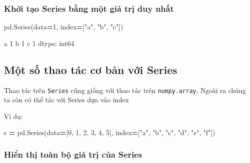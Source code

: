 \documentclass[
]{book}
\newenvironment{Shaded}{\begin{snugshade}}{\end{snugshade}}
\newcommand{\DecValTok}[1]{\textcolor[rgb]{0.00,0.00,0.81}{#1}}
\newcommand{\NormalTok}[1]{#1}
\newcommand{\OperatorTok}[1]{\textcolor[rgb]{0.81,0.36,0.00}{\textbf{#1}}}
\newcommand{\StringTok}[1]{\textcolor[rgb]{0.31,0.60,0.02}{#1}}
\begin{document}
\subsubsection*{Khởi tạo Series bằng một giá trị duy nhất}\label{khux1edfi-tux1ea1o-series-bux1eb1ng-mux1ed9t-giuxe1-trux1ecb-duy-nhux1ea5t}


\begin{Shaded}
\begin{Highlighting}[]
\NormalTok{pd.Series(data}\OperatorTok{=}\DecValTok{1}\NormalTok{, index}\OperatorTok{=}\NormalTok{[}\StringTok{"a"}\NormalTok{, }\StringTok{"b"}\NormalTok{, }\StringTok{"c"}\NormalTok{])}
\end{Highlighting}
\end{Shaded}

\begin{Shaded}
\begin{Highlighting}[]
\NormalTok{a    1}
\NormalTok{b    1}
\NormalTok{c    1}
\NormalTok{dtype: int64}
\end{Highlighting}
\end{Shaded}

\subsection{Một số thao tác cơ bản với Series}\label{mux1ed9t-sux1ed1-thao-tuxe1c-cux1a1-bux1ea3n-vux1edbi-series}

Thao tác trên \texttt{Series} cũng giống với thao tác trên \texttt{numpy.array}. Ngoài ra chúng ta còn có thể
tác với Series dựa vào index

Ví dụ:

\begin{Shaded}
\begin{Highlighting}[]
\NormalTok{s }\OperatorTok{=}\NormalTok{ pd.Series(data}\OperatorTok{=}\NormalTok{[}\DecValTok{0}\NormalTok{, }\DecValTok{1}\NormalTok{, }\DecValTok{2}\NormalTok{, }\DecValTok{3}\NormalTok{, }\DecValTok{4}\NormalTok{, }\DecValTok{5}\NormalTok{], index}\OperatorTok{=}\NormalTok{[}\StringTok{"a"}\NormalTok{, }\StringTok{"b"}\NormalTok{, }\StringTok{"c"}\NormalTok{, }\StringTok{"d"}\NormalTok{, }\StringTok{"e"}\NormalTok{, }\StringTok{"f"}\NormalTok{])}
\end{Highlighting}
\end{Shaded}

\subsubsection*{Hiển thị toàn bộ giá trị của Series}\label{hiux1ec3n-thux1ecb-touxe0n-bux1ed9-giuxe1-trux1ecb-cux1ee7a-series}
\end{document}

